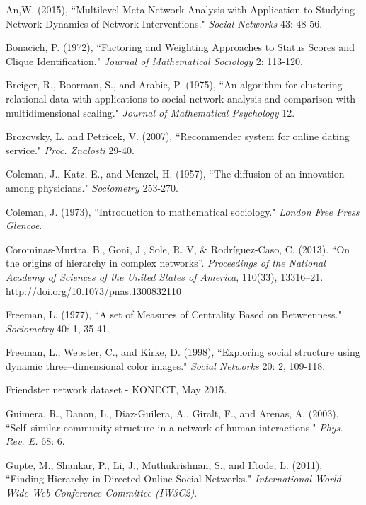 \documentclass[3p,times]{elsarticle}
\begin{document}
\begin{thebibliography}{9}
	An,W. (2015),
	``Multilevel Meta Network Analysis with Application to Studying Network Dynamics of Network Interventions." \textit{Social Networks} 43: 48-56.
	
	Bonacich, P. (1972),
	``Factoring and Weighting Approaches to Status Scores and Clique Identification." 
	\textit{Journal of Mathematical Sociology} 2: 113-120.
	
	Breiger, R., Boorman, S., and Arabie, P. (1975),
	``An algorithm for clustering relational data with applications to social network analysis and comparison with multidimensional scaling."
	\textit{Journal of Mathematical Psychology} 12.
	
	Brozovsky, L. and Petricek, V. (2007),
	``Recommender system for online dating service."
	\textit{Proc. Znalosti} 29-40.
	
	Coleman, J., Katz, E., and Menzel, H. (1957),
	``The diffusion of an innovation among physicians."
	\textit{Sociometry} 253-270.
	
	Coleman, J. (1973),
	``Introduction to mathematical sociology."
	\textit{London Free Press Glencoe}.
	
	Corominas-Murtra, B., Goni, J., Sole, R. V, \& Rodríguez-Caso, C. (2013). ``On the origins of hierarchy in complex networks''. \emph{Proceedings of the National Academy of Sciences of the United States of America}, 110(33), 13316–21. \href{http://doi.org/10.1073/pnas.1300832110}{http://doi.org/10.1073/pnas.1300832110}
	
	Freeman, L. (1977),
	``A set of Measures of Centrality Based on Betweenness." 
	\textit{Sociometry} 40: 1, 35-41.
	
	Freeman, L., Webster, C., and Kirke, D. (1998),
	``Exploring social structure using dynamic three--dimensional color images."
	\textit{Social Networks} 20: 2, 109-118.
	
	Friendster network dataset - KONECT, May 2015.
	
	Guimera, R., Danon, L., Diaz-Guilera, A., Giralt, F., and Arenas, A. (2003),
	``Self--similar community structure in a network of human interactions."
	\textit{Phys. Rev. E.} 68: 6.
	
	Gupte, M., Shankar, P., Li, J., Muthukrishnan, S., and Iftode, L. (2011),
	``Finding Hierarchy in Directed Online Social Networks." 
	\textit{International World Wide Web Conference Committee (IW3C2)}.
	

\end{thebibliography}
\end{document}

